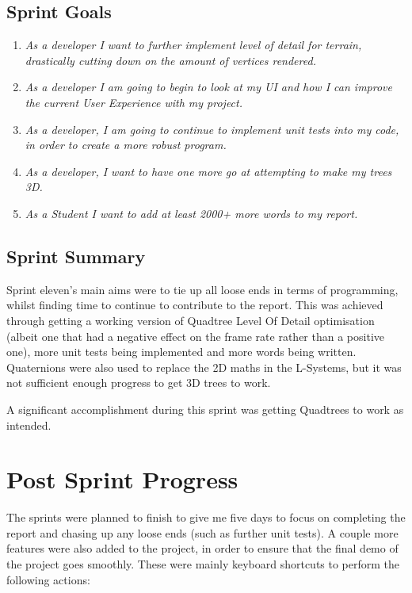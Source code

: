 \documentclass[a4paper,10pt]{report}
\begin{document}
\subsection{Sprint Goals}
\begin{enumerate}
    \item\textit{ As a developer I want to further implement level of detail for terrain, drastically cutting down on the amount of vertices rendered.}

\item\textit{ As a developer I am going to begin to look at my UI and how I can improve the current User Experience with my project.}

\item\textit{ As a developer, I am going to continue to implement unit tests into my code, in order to create a more robust program. }

\item\textit{ As a developer, I want to have one more go at attempting to make my trees 3D. }

\item\textit{ As a Student I want to add at least 2000+ more words to my report.}

\end{enumerate}

\subsection{Sprint Summary}
Sprint eleven's main aims were to tie up all loose ends in terms of programming, whilst finding time to continue to contribute to the report. This was achieved through getting a working version of Quadtree Level Of Detail optimisation (albeit one that had a negative effect on the frame rate rather than a positive one), more unit tests being implemented and more words being written. Quaternions were also used to replace the 2D maths in the L-Systems, but it was not sufficient enough progress to get 3D trees to work. \medskip

A significant accomplishment during this sprint was getting Quadtrees to work as intended.

\clearpage
\section{Post Sprint Progress}
The sprints were planned to finish to give me five days to focus on completing the report and chasing up any loose ends (such as further unit tests). A couple more features were also added to the project, in order to ensure that the final demo of the project goes smoothly. These were mainly keyboard shortcuts to perform the following actions:
\end{document}
